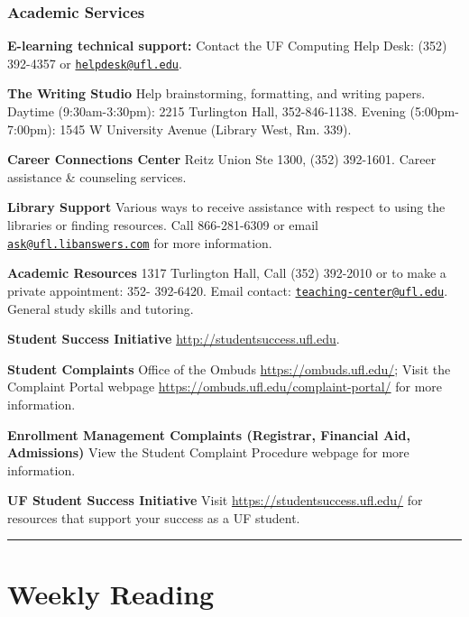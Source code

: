 \documentclass[
  10pt,
  letterpaper,
  oneside,
  open=any]{scrbook}
\begin{document}
\subsection*{Academic Services}\label{academic-services}

\textbf{E-learning technical support: } Contact the UF Computing Help
Desk: (352) 392-4357 or
\href{mailto:helpdesk@ufl.edu}{\nolinkurl{helpdesk@ufl.edu}}.

\textbf{The Writing Studio} Help brainstorming, formatting, and writing
papers. Daytime (9:30am-3:30pm): 2215 Turlington Hall, 352-846-1138.
Evening (5:00pm-7:00pm): 1545 W University Avenue (Library West, Rm.
339).

\textbf{Career Connections Center} Reitz Union Ste 1300, (352) 392-1601.
Career assistance \& counseling services.

\textbf{Library Support} Various ways to receive assistance with respect
to using the libraries or finding resources. Call 866-281-6309 or email
\href{mailto:ask@ufl.libanswers.com}{\nolinkurl{ask@ufl.libanswers.com}}
for more information.

\textbf{Academic Resources} 1317 Turlington Hall, Call (352) 392-2010 or
to make a private appointment: 352- 392-6420. Email contact:
\href{mailto:teaching-center@ufl.edu}{\nolinkurl{teaching-center@ufl.edu}}.
General study skills and tutoring.

\textbf{Student Success Initiative} \url{http://studentsuccess.ufl.edu}.

\textbf{Student Complaints} Office of the Ombuds
\url{https://ombuds.ufl.edu/}; Visit the Complaint Portal webpage
\url{https://ombuds.ufl.edu/complaint-portal/} for more information.

\textbf{Enrollment Management Complaints (Registrar, Financial Aid,
Admissions)} View the Student Complaint Procedure webpage for more
information.

\textbf{UF Student Success Initiative} Visit
\url{https://studentsuccess.ufl.edu/} for resources that support your
success as a UF student.

\begin{center}\rule{0.5\linewidth}{0.5pt}\end{center}


\chapter{Weekly Reading}\label{weekly-reading}
\end{document}
